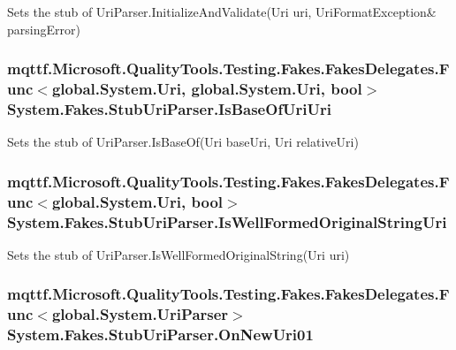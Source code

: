 Sets the stub of Uri\-Parser.\-Initialize\-And\-Validate(Uri uri, Uri\-Format\-Exception\& parsing\-Error)

\hypertarget{class_system_1_1_fakes_1_1_stub_uri_parser_acfab181be1618d73fea64ecb110d8c8a}{
\subsubsection[{Is\-Base\-Of\-Uri\-Uri}]{\setlength{\rightskip}{0pt plus 5cm}mqttf.\-Microsoft.\-Quality\-Tools.\-Testing.\-Fakes.\-Fakes\-Delegates.\-Func$<$global.\-System.\-Uri, global.\-System.\-Uri, bool$>$ System.\-Fakes.\-Stub\-Uri\-Parser.\-Is\-Base\-Of\-Uri\-Uri}}\label{class_system_1_1_fakes_1_1_stub_uri_parser_acfab181be1618d73fea64ecb110d8c8a}


Sets the stub of Uri\-Parser.\-Is\-Base\-Of(\-Uri base\-Uri, Uri relative\-Uri)

\hypertarget{class_system_1_1_fakes_1_1_stub_uri_parser_ab244fb4d317dee324a9a3d5e826ba90d}{
\subsubsection[{Is\-Well\-Formed\-Original\-String\-Uri}]{\setlength{\rightskip}{0pt plus 5cm}mqttf.\-Microsoft.\-Quality\-Tools.\-Testing.\-Fakes.\-Fakes\-Delegates.\-Func$<$global.\-System.\-Uri, bool$>$ System.\-Fakes.\-Stub\-Uri\-Parser.\-Is\-Well\-Formed\-Original\-String\-Uri}}\label{class_system_1_1_fakes_1_1_stub_uri_parser_ab244fb4d317dee324a9a3d5e826ba90d}


Sets the stub of Uri\-Parser.\-Is\-Well\-Formed\-Original\-String(\-Uri uri)

\hypertarget{class_system_1_1_fakes_1_1_stub_uri_parser_ac680f87c0c206c1325feed6cbb0cabdb}{
\subsubsection[{On\-New\-Uri01}]{\setlength{\rightskip}{0pt plus 5cm}mqttf.\-Microsoft.\-Quality\-Tools.\-Testing.\-Fakes.\-Fakes\-Delegates.\-Func$<$global.\-System.\-Uri\-Parser$>$ System.\-Fakes.\-Stub\-Uri\-Parser.\-On\-New\-Uri01}}\label{class_system_1_1_fakes_1_1_stub_uri_parser_ac680f87c0c206c1325feed6cbb0cabdb}


